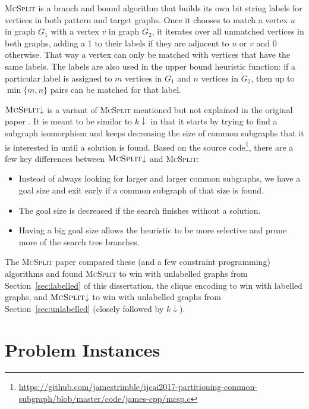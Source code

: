 \documentclass{l4proj}
\theoremstyle{definition}
\theoremstyle{remark}
\begin{document}
\textsc{McSplit} \cite{DBLP:conf/ijcai/McCreeshPT17} is a branch and bound
algorithm that builds its own bit string labels for vertices in both pattern and
target graphs. Once it chooses to match a vertex $u$ in graph $G_1$ with a
vertex $v$ in graph $G_2$, it iterates over all unmatched vertices in both
graphs, adding a 1 to their labels if they are adjacent to $u$ or $v$ and 0
otherwise. That way a vertex can only be matched with vertices that have the
same labels. The labels are also used in the upper bound heuristic function:
if a particular label is assigned to $m$ vertices in $G_1$ and $n$ vertices in
$G_2$, then up to $\min \{ m, n \}$ pairs can be matched for that label.

$\textsc{McSplit} {\downarrow}$ is a variant of \textsc{McSplit} mentioned but not
explained in the original paper \cite{DBLP:conf/ijcai/McCreeshPT17}. It is meant
to be similar to $k{\downarrow}$ in that it starts by trying to find a subgraph
isomorphism and keeps decreasing the size of common subgraphs that it is
interested in until a solution is found. Based on the source
code\footnote{\url{https://github.com/jamestrimble/ijcai2017-partitioning-common-subgraph/blob/master/code/james-cpp/mcsp.c}},
there are a few key differences between $\textsc{McSplit} {\downarrow}$ and
\textsc{McSplit}:

\begin{itemize}
\item Instead of always looking for larger and larger common subgraphs, we have
  a goal size and exit early if a common subgraph of that size is found.
\item The goal size is decreased if the search finishes without a solution.
\item Having a big goal size allows the heuristic to be more selective and prune
  more of the search tree branches.
\end{itemize}

The \textsc{McSplit} paper \cite{DBLP:conf/ijcai/McCreeshPT17} compared these
(and a few constraint programming) algorithms and found \textsc{McSplit} to win
with unlabelled graphs from Section~\ref{sec:labelled} of this dissertation, the
clique encoding to win with labelled graphs, and $\textsc{McSplit}{\downarrow}$
to win with unlabelled graphs from Section~\ref{sec:unlabelled} (closely
followed by $k{\downarrow}$).

\chapter{Problem Instances} \label{chapter:problems}
\end{document}
